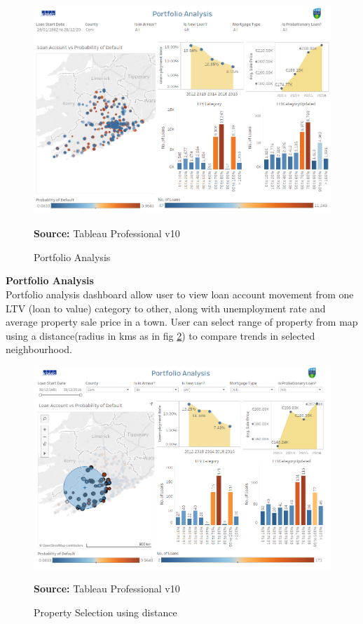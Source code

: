 \begin{center}
\begin{figure}[!htb]
\includegraphics[width=\textwidth]{Analysis.png}
\centering
\caption{Portfolio Analysis}{\textbf{Source:} Tableau Professional v10}
\label{fig:overview}
\end{figure}
\end{center}
\textbf{Portfolio Analysis}\\
Portfolio analysis dashboard allow user to view loan account movement from one LTV (loan to value) category to other, along with unemployment rate and average property sale price in a town. User can select range of property from map using a distance(radius in kms as in fig \ref{fig:dist}) to compare trends in selected neighbourhood.

\begin{center}
\begin{figure}[!htb]
\includegraphics[width=\textwidth]{dist.png}
\centering
\caption{Property Selection using distance}{\textbf{Source:} Tableau Professional v10}
\label{fig:dist}
\end{figure}
\end{center}


